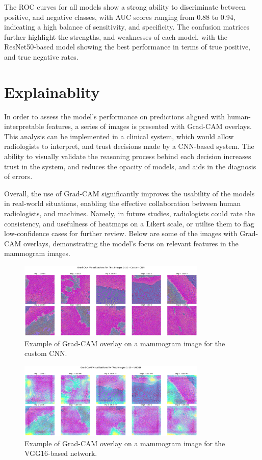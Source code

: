 \documentclass[../main]{subfiles}
\begin{document}
\noindent The ROC curves for all models show a strong ability to discriminate between positive, and negative classes, with AUC scores ranging from 0.88 to 0.94, indicating a high balance of sensitivity, and specificity. The confusion matrices further highlight the strengths, and weaknesses of each model, with the ResNet50-based model showing the best performance in terms of true positive, and true negative rates.

\section{Explainablity}
\label{sec:explainability}
In order to assess the model's performance on predictions aligned with human-interpretable features, a series of images is presented with Grad-CAM overlays. This analysis can be implemented in a clinical system, which would allow radiologists to interpret, and trust decisions made by a CNN-based system. The ability to visually validate the reasoning process behind each decision increases trust in the system, and reduces the opacity of models, and aids in the diagnosis of errors.

Overall, the use of Grad-CAM significantly improves the usability of the models in real-world situations, enabling the effective collaboration between human radiologists, and machines. Namely, in future studies, radiologists could rate the consistency, and usefulness of heatmaps on a Likert scale, or utilise them to flag low-confidence cases for further review. Below are some of the images with Grad-CAM overlays, demonstrating the model's focus on relevant features in the mammogram images.

\begin{figure}[h]
    \centering
    \includegraphics[width=0.8\textwidth]{assets/grad_cam_custom_cnn.png}
    \caption{Example of Grad-CAM overlay on a mammogram image for the custom CNN.}
    \label{fig:grad-cam-custom-cnn}
\end{figure}

\begin{figure}[h]
    \centering
    \includegraphics[width=0.8\textwidth]{assets/grad_cam_vgg16.png}
    \caption{Example of Grad-CAM overlay on a mammogram image for the VGG16-based network.}
    \label{fig:grad-cam-vgg16}
\end{figure}
\end{document}
